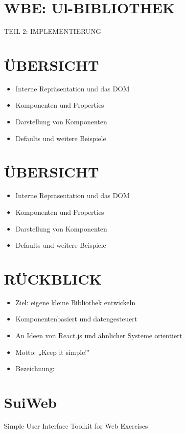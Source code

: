 \documentclass[10pt]{article}
\author{SuiWeb: JSX, SJDON\\
demo-01-jsx.html\\
demo-01-sjdon.html\\
Didact: (Rodrigo Pombo)\\
https://codesandbox.io/s/didact-2-k6rbj?file=/src/index.js}
\date{}
\begin{document}
\maketitle
\section*{WBE: Ul-BIBLIOTHEK}
 TEIL 2: IMPLEMENTIERUNG\section*{ÜBERSICHT}
\begin{itemize}
  \item Interne Repräsentation und das DOM
  \item Komponenten und Properties
  \item Darstellung von Komponenten
  \item Defaults und weitere Beispiele
\end{itemize}

\section*{ÜBERSICHT}
\begin{itemize}
  \item Interne Repräsentation und das DOM
  \item Komponenten und Properties
  \item Darstellung von Komponenten
  \item Defaults und weitere Beispiele
\end{itemize}

\section*{RÜCKBLICK}
\begin{itemize}
  \item Ziel: eigene kleine Bibliothek entwickeln
  \item Komponentenbasiert und datengesteuert
  \item An Ideen von React.js und ähnlicher Systeme orientiert
  \item Motto: „Keep it simple!"
  \item Bezeichnung:
\end{itemize}

\section*{SuiWeb}
Simple User Interface Toolkit for Web Exercises
\end{document}

